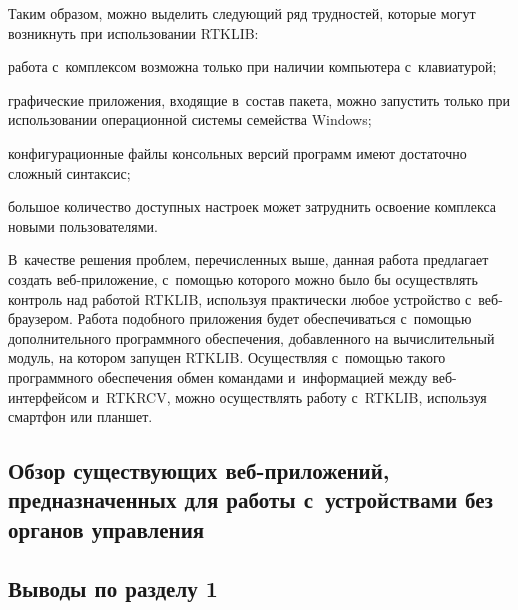Таким образом, можно выделить следующий ряд трудностей, которые могут возникнуть при использовании RTKLIB:

\begin{dashitemize}
  \item работа с~комплексом возможна только при наличии компьютера с~клавиатурой;
  \item графические приложения, входящие в~состав пакета, можно запустить только при использовании операционной системы семейства Windows;
  \item конфигурационные файлы консольных версий программ имеют достаточно сложный синтаксис;
  \item большое количество доступных настроек может затруднить освоение комплекса новыми пользователями.
\end{dashitemize}

В~качестве решения проблем, перечисленных выше, данная работа предлагает создать веб-приложение, с~помощью которого можно было бы осуществлять контроль над работой RTKLIB, используя практически любое устройство с~веб-браузером. Работа подобного приложения будет обеспечиваться с~помощью дополнительного программного обеспечения, добавленного на вычислительный модуль, на котором запущен RTKLIB. Осуществляя с~помощью такого программного обеспечения обмен командами и~информацией между веб-интерфейсом и~RTKRCV, можно осуществлять работу с~RTKLIB, используя смартфон или планшет.

\subsection{Обзор существующих веб-приложений, предназначенных для работы с~устройствами без органов управления}

\subsection{Выводы по разделу 1}

\newpage

